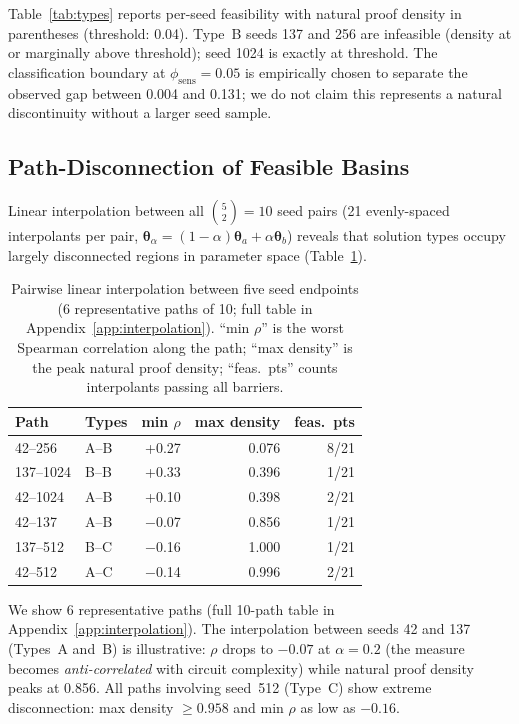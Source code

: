 \documentclass[twoside]{article}
\newcommand{\btheta}{\boldsymbol{\theta}}
\begin{document}
Table~\ref{tab:types} reports per-seed feasibility with natural proof density in
parentheses (threshold: 0.04). Type~B seeds 137 and 256 are infeasible (density
at or marginally above threshold); seed 1024 is exactly at threshold. The
classification boundary at $\phi_{\text{sens}} = 0.05$ is empirically chosen to
separate the observed gap between 0.004 and 0.131; we do not claim this represents
a natural discontinuity without a larger seed sample.

\subsection{Path-Disconnection of Feasible Basins}

Linear interpolation between all $\binom{5}{2} = 10$ seed pairs
(21 evenly-spaced interpolants per pair, $\btheta_\alpha = (1-\alpha)\btheta_a
+ \alpha\btheta_b$) reveals that solution types occupy largely disconnected
regions in parameter space (Table~\ref{tab:interpolation}).

\begin{table}[t]
\caption{Pairwise linear interpolation between five seed endpoints
(6 representative paths of 10; full table in Appendix~\ref{app:interpolation}).
``min $\rho$'' is the worst Spearman correlation along the path; ``max density''
is the peak natural proof density; ``feas.\ pts'' counts interpolants
passing all barriers.}
\label{tab:interpolation}
\centering
\begin{tabular}{llrrr}
\toprule
Path & Types & min $\rho$ & max density & feas.\ pts \\
\midrule
42--256 & A--B & +0.27 & 0.076 & 8/21 \\
137--1024 & B--B & +0.33 & 0.396 & 1/21 \\
42--1024 & A--B & +0.10 & 0.398 & 2/21 \\
42--137 & A--B & $-$0.07 & 0.856 & 1/21 \\
137--512 & B--C & $-$0.16 & 1.000 & 1/21 \\
42--512 & A--C & $-$0.14 & 0.996 & 2/21 \\
\bottomrule
\end{tabular}
\end{table}

We show 6 representative paths (full 10-path table in Appendix~\ref{app:interpolation}).
The interpolation between seeds 42 and 137 (Types~A and~B) is illustrative:
$\rho$ drops to $-0.07$ at $\alpha = 0.2$ (the measure becomes
\emph{anti-correlated} with circuit complexity) while natural proof density peaks
at 0.856. All paths involving seed~512 (Type~C) show extreme disconnection:
max density $\geq 0.958$ and min $\rho$ as low as $-0.16$.
\end{document}
